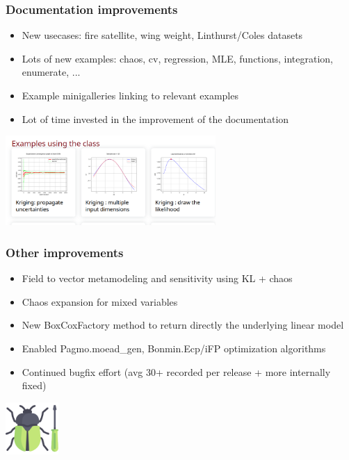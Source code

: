\documentclass[aspectratio=169]{beamer}
\begin{document}
\begin{frame}
\frametitle{Documentation improvements}
\begin{itemize}
\item New usecases: fire satellite, wing weight, Linthurst/Coles datasets
\item Lots of new examples: chaos, cv, regression, MLE, functions, integration, enumerate, ...
\item Example minigalleries linking to relevant examples
\item Lot of time invested in the improvement of the documentation
\end{itemize}

\begin{center}
\includegraphics[width=0.6\textwidth]{figures/minigallery}
\end{center}
\end{frame}

\begin{frame}
\frametitle{Other improvements}
\begin{itemize}
\item Field to vector metamodeling and sensitivity using KL + chaos
\item Chaos expansion for mixed variables
\item New BoxCoxFactory method to return directly the underlying linear model
\item Enabled Pagmo.moead\_gen, Bonmin.Ecp/iFP optimization algorithms
\item Continued bugfix effort (avg 30+ recorded per release + more internally fixed)
\end{itemize}

\vspace{6pt}

\begin{center}
\includegraphics[width=0.15\textwidth]{figures/bugfix}
\end{center}

\end{frame}
\end{document}
